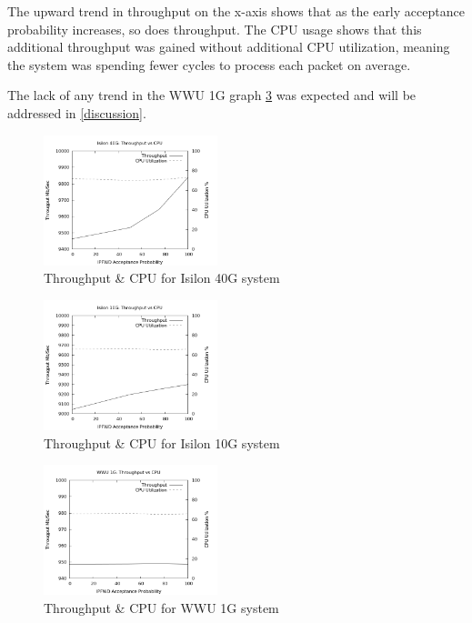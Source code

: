 \documentclass[journal]{IEEEtran}
\begin{document}
    The upward trend in throughput on the x-axis shows that as the early
    acceptance probability increases, so does throughput. The CPU usage shows
    that this additional throughput was gained without additional CPU
    utilization, meaning the system was spending fewer cycles to process each
    packet on average.

    The lack of any trend in the WWU 1G graph \ref{fig:wwucpu1} was expected
    and will be addressed in \ref{discussion}.
    
    \begin{figure}[h]
      \includegraphics[width=0.45\textwidth]{cpu_isilon40}
      \caption{Throughput \& CPU for Isilon 40G system}
      \label{fig:isiloncpu40}
    \end{figure}
    \begin{figure}[h]
      \includegraphics[width=0.45\textwidth]{cpu_isilon10}
      \caption{Throughput \& CPU for Isilon 10G system}
      \label{fig:isiloncpu10}
    \end{figure}
    \begin{figure}[h]
      \includegraphics[width=0.45\textwidth]{cpu_wwu1}
      \caption{Throughput \& CPU for WWU 1G system}
      \label{fig:wwucpu1}
    \end{figure}
\end{document}
